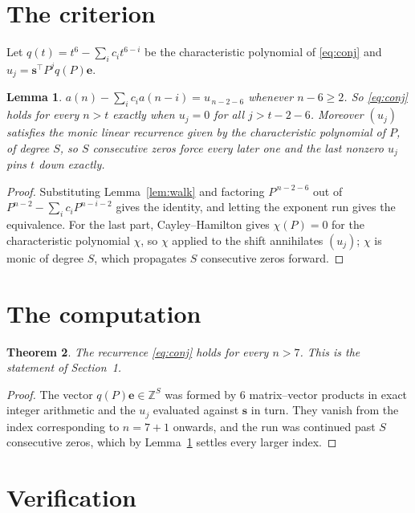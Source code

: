 \documentclass[11pt,a4paper]{article}
\theoremstyle{plain}
\newtheorem{theorem}{Theorem}
\newtheorem{lemma}[theorem]{Lemma}
\theoremstyle{definition}
\begin{document}
\section{The criterion}

Let $q(t)=t^{6}-\sum_i c_i t^{6-i}$ be the characteristic polynomial of
\eqref{eq:conj} and $u_j=\mathbf{s}^{\!\top}P^{j}q(P)\mathbf{e}$.

\begin{lemma}\label{lem:crit}
$a(n)-\sum_i c_i a(n-i)=u_{\,n-2-6}$ whenever $n-6\ge2$. So \eqref{eq:conj}
holds for every $n>t$ exactly when $u_j=0$ for all $j>t-2-6$. Moreover $(u_j)$
satisfies the monic linear recurrence given by the characteristic polynomial of $P$, of
degree $S$, so $S$ consecutive zeros force every later one and the last nonzero $u_j$ pins
$t$ down exactly.
\end{lemma}

\begin{proof}
Substituting Lemma~\ref{lem:walk} and factoring $P^{\,n-2-6}$ out of
$P^{n-2}-\sum_i c_i P^{n-i-2}$ gives the identity, and letting the exponent run gives the
equivalence. For the last part, Cayley--Hamilton gives $\chi(P)=0$ for the characteristic
polynomial $\chi$, so $\chi$ applied to the shift annihilates $(u_j)$; $\chi$ is monic of
degree $S$, which propagates $S$ consecutive zeros forward.
\end{proof}

\section{The computation}

\begin{theorem}
The recurrence \eqref{eq:conj} holds for every $n>7$. This is the statement of
Section~1.
\end{theorem}

\begin{proof}
The vector $q(P)\mathbf{e}\in\mathbb{Z}^{S}$ was formed by $6$ matrix--vector
products in exact integer arithmetic and the $u_j$ evaluated against $\mathbf{s}$ in turn.
They vanish from the index corresponding to $n=7+1$ onwards, and the run was continued
past $S$ consecutive zeros, which by Lemma~\ref{lem:crit} settles every larger index.
\end{proof}

\section{Verification}
\end{document}
